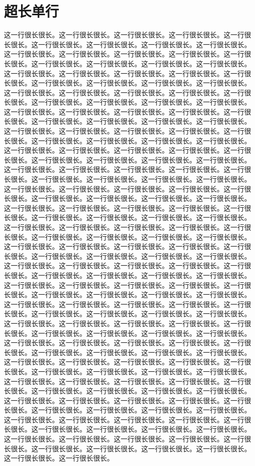 \documentclass{article}
\begin{document}
\section{超长单行}
这一行很长很长。这一行很长很长。这一行很长很长。这一行很长很长。这一行很长很长。这一行很长很长。这一行很长很长。这一行很长很长。这一行很长很长。这一行很长很长。这一行很长很长。这一行很长很长。这一行很长很长。这一行很长很长。这一行很长很长。这一行很长很长。这一行很长很长。这一行很长很长。这一行很长很长。这一行很长很长。这一行很长很长。这一行很长很长。这一行很长很长。这一行很长很长。这一行很长很长。这一行很长很长。这一行很长很长。这一行很长很长。这一行很长很长。这一行很长很长。这一行很长很长。这一行很长很长。这一行很长很长。这一行很长很长。这一行很长很长。这一行很长很长。这一行很长很长。这一行很长很长。这一行很长很长。这一行很长很长。这一行很长很长。这一行很长很长。这一行很长很长。这一行很长很长。这一行很长很长。这一行很长很长。这一行很长很长。这一行很长很长。这一行很长很长。这一行很长很长。这一行很长很长。这一行很长很长。这一行很长很长。这一行很长很长。这一行很长很长。这一行很长很长。这一行很长很长。这一行很长很长。这一行很长很长。这一行很长很长。这一行很长很长。这一行很长很长。这一行很长很长。这一行很长很长。这一行很长很长。这一行很长很长。这一行很长很长。这一行很长很长。这一行很长很长。这一行很长很长。这一行很长很长。这一行很长很长。这一行很长很长。这一行很长很长。这一行很长很长。这一行很长很长。这一行很长很长。这一行很长很长。这一行很长很长。这一行很长很长。这一行很长很长。这一行很长很长。这一行很长很长。这一行很长很长。这一行很长很长。这一行很长很长。这一行很长很长。这一行很长很长。这一行很长很长。这一行很长很长。这一行很长很长。这一行很长很长。这一行很长很长。这一行很长很长。这一行很长很长。这一行很长很长。这一行很长很长。这一行很长很长。这一行很长很长。这一行很长很长。这一行很长很长。这一行很长很长。这一行很长很长。这一行很长很长。这一行很长很长。这一行很长很长。这一行很长很长。这一行很长很长。这一行很长很长。这一行很长很长。这一行很长很长。这一行很长很长。这一行很长很长。这一行很长很长。这一行很长很长。这一行很长很长。这一行很长很长。这一行很长很长。这一行很长很长。这一行很长很长。这一行很长很长。这一行很长很长。这一行很长很长。这一行很长很长。这一行很长很长。这一行很长很长。这一行很长很长。这一行很长很长。这一行很长很长。这一行很长很长。这一行很长很长。这一行很长很长。这一行很长很长。这一行很长很长。这一行很长很长。这一行很长很长。这一行很长很长。这一行很长很长。这一行很长很长。这一行很长很长。这一行很长很长。这一行很长很长。这一行很长很长。这一行很长很长。这一行很长很长。这一行很长很长。这一行很长很长。这一行很长很长。这一行很长很长。这一行很长很长。这一行很长很长。这一行很长很长。这一行很长很长。这一行很长很长。这一行很长很长。这一行很长很长。这一行很长很长。这一行很长很长。这一行很长很长。这一行很长很长。这一行很长很长。这一行很长很长。这一行很长很长。这一行很长很长。这一行很长很长。这一行很长很长。这一行很长很长。这一行很长很长。这一行很长很长。这一行很长很长。这一行很长很长。这一行很长很长。这一行很长很长。这一行很长很长。这一行很长很长。这一行很长很长。这一行很长很长。这一行很长很长。这一行很长很长。这一行很长很长。这一行很长很长。这一行很长很长。这一行很长很长。这一行很长很长。这一行很长很长。这一行很长很长。这一行很长很长。这一行很长很长。这一行很长很长。这一行很长很长。这一行很长很长。这一行很长很长。这一行很长很长。这一行很长很长。这一行很长很长。这一行很长很长。这一行很长很长。这一行很长很长。这一行很长很长。这一行很长很长。
\end{document}
